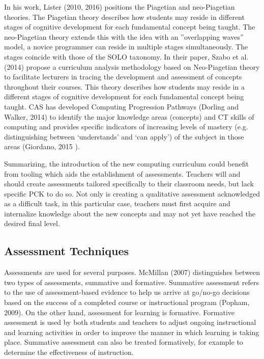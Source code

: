 In his work, Lister (2010, 2016) positions the Piagetian and neo-Piagetian theories. The Piagetian theory describes how students may reside in different stages of cognitive development for each fundamental concept being taught. The neo-Piagetian theory extends this with the idea with an ”overlapping waves” model, a novice programmer can reside in multiple stages simultaneously. The stages coincide with those of the SOLO taxonomy. In their paper, Szabo et al. (2014) propose a curriculum analysis methodology based on Neo-Piagetian theory to facilitate lecturers in tracing the development and assessment of concepts throughout their courses. This theory describes how students may reside in a different stages of cognitive development for each fundamental concept being taught. CAS has developed Computing Progression Pathways (Dorling and Walker, 2014) to identify the major knowledge areas (concepts) and CT skills of computing and provides specific indicators of increasing levels of mastery (e.g. distinguishing between ‘understands’ and ‘can apply’) of the subject in those areas (Giordano, 2015  ). 

Summarizing, the introduction of the new computing curriculum could benefit from tooling which aids the establishment of assessments. Teachers will and should create assessments tailored specifically to their classroom needs, but lack specific PCK to do so. Not only is creating a qualitative assessment acknowledged as a difficult task, in this particular case, teachers must first acquire and internalize knowledge about the new concepts and may not yet have reached the desired final level.





\subsection{Assessment Techniques}
Assessments are used for several purposes. McMillan (2007) distinguishes between two types of assessments, summative and formative. Summative assessment refers to the use of assessment-based evidence to help us arrive at go/no-go decisions based on the success of a completed course or instructional program (Popham, 2009). On the other hand, assessment for learning is formative. Formative assessment is used by both students and teachers to adjust ongoing instructional and learning activities in order to improve the manner in which learning is taking place. Summative assessment can also be treated formatively, for example to determine the effectiveness of instruction.


